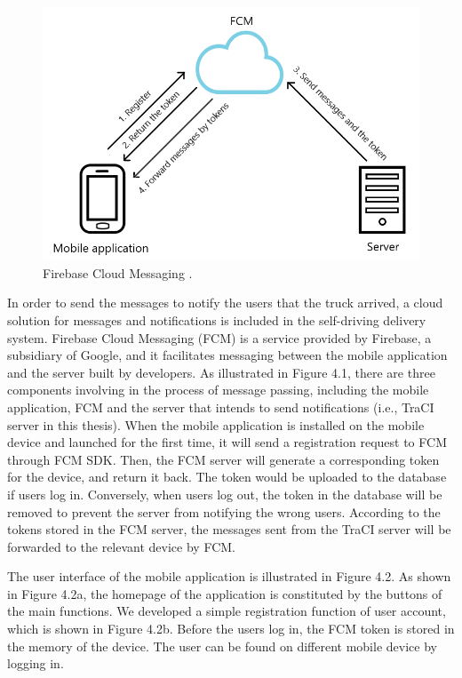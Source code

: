 \documentclass[12pt]{ksthesis}
\begin{document}
\begin{thesis}
{\begin{figure}[H]
\centering
\includegraphics[width=1.0\textwidth]{./figures/F4-1_FCM.PNG}
\caption{\large Firebase Cloud Messaging .}
\vspace{0.5cm}
\label{Fig:FCM}
\end{figure}

In order to send the messages to notify the users that the truck arrived, a cloud solution for messages and notifications is included in the self-driving delivery system. Firebase Cloud Messaging (FCM) is a service provided by Firebase, a subsidiary of Google, and it facilitates messaging between the mobile application and the server built by developers. As illustrated in Figure 4.1, there are three components involving in the process of message passing, including the mobile application, FCM and the server that intends to send notifications (i.e., TraCI server in this thesis). When the mobile application is installed on the mobile device and launched for the first time, it will send a registration request to FCM through FCM SDK. Then, the FCM server will generate a corresponding token for the device, and return it back. The token would be uploaded to the database if users log in. Conversely, when users log out, the token in the database will be removed to prevent the server from notifying the wrong users. According to the tokens stored in the FCM server, the messages sent from the TraCI server will be forwarded to the relevant device by FCM.

The user interface of the mobile application is illustrated in Figure 4.2. As shown in Figure 4.2a, the homepage of the application is constituted by the buttons of the main functions. We developed a simple registration function of user account, which is shown in Figure 4.2b. Before the users log in, the FCM token is stored in the memory of the device. The user can be found on different mobile device by logging in.
 
}
\end{thesis}
\end{document}

